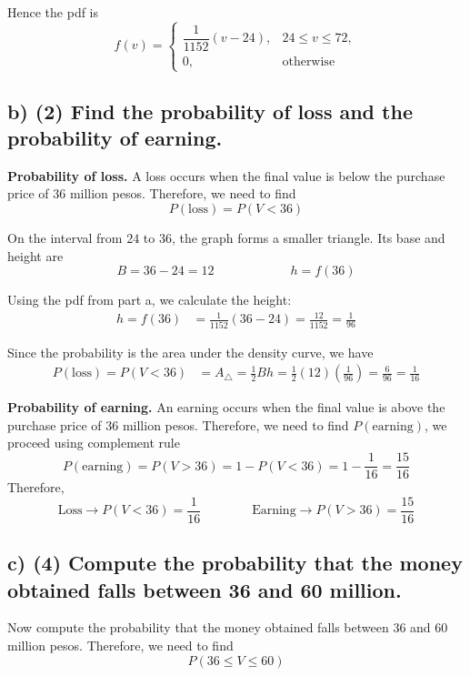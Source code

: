 %
Hence the pdf is
\[
f(v)=
\begin{cases}
	\dfrac{1}{1152}(v-24), & 24\le v\le 72,\\[0.2cm]
	0, & \text{otherwise}
\end{cases}
\]



\subsection*{b) \textbf{(2)} Find the probability of loss and the probability of earning.}
\label{subsec:online-coffee-sales-investment-c1-b}
\textbf{Probability of loss.} A loss occurs when the final value is below the purchase price of $36$ million pesos. Therefore, we need to find
\[
P(\text{loss})=P(V<36)
\]

On the interval from $24$ to $36$, the graph forms a smaller triangle. Its base and height are
\[
B=36-24=12
\qquad \qquad \qquad
h=f(36)
\]

Using the pdf from part a, we calculate the height:
\[
\begin{aligned}
	h=f(36)
	&=\frac{1}{1152}(36-24)
	=\frac{12}{1152}
	=\frac{1}{96}
\end{aligned}
\]

Since the probability is the area under the density curve, we have
\[
\begin{aligned}
	P(\text{loss})=P(V<36)
	&=A_{\triangle}
	=\frac{1}{2}Bh
	=\frac{1}{2}(12)\left(\frac{1}{96}\right)
	=\frac{6}{96}
	=\frac{1}{16}
\end{aligned}
\]

\textbf{Probability of earning.} An earning occurs when the final value is above the purchase price of $36$ million pesos. Therefore, we need to find $P(\text{earning})$, we proceed using complement rule
\[
P(\text{earning})=P(V>36)=1-P(V<36)=1-\frac{1}{16}
=\frac{15}{16}
\]
%
Therefore,
\[
\text{Loss} \rightarrow P(V<36)=\frac{1}{16}
\qquad\qquad
\text{Earning} \rightarrow P(V>36)=\frac{15}{16}
\]



\subsection*{c) \textbf{(4)} Compute the probability that the money obtained falls between 36 and 60 million.}
\label{subsec:online-coffee-sales-investment-c1-c}
Now compute the probability that the money obtained falls between $36$ and $60$ million pesos. Therefore, we need to find
\[
P(36\le V\le 60)
\]

